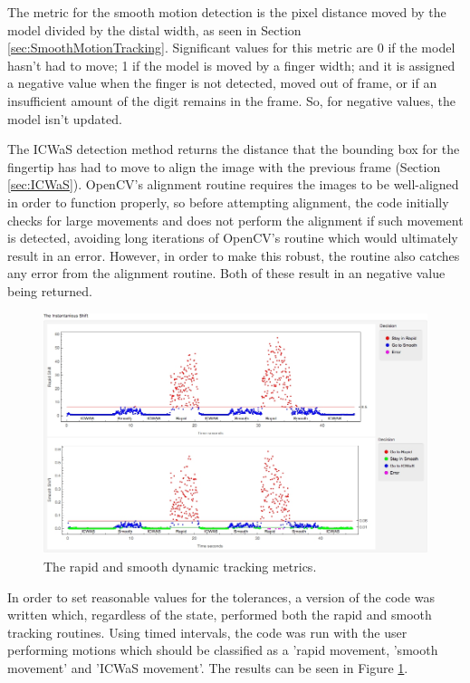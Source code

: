 The metric for the smooth motion detection is the pixel distance moved by the model divided by the distal width, as seen in Section \ref{sec:SmoothMotionTracking}. Significant values for this metric are 0 if the model hasn't had to move; 1 if the model is moved by a finger width; and it is assigned a negative value when the finger is not detected, moved out of frame, or if an insufficient amount of the digit remains in the frame. So, for negative values, the model isn't updated.

The ICWaS detection method returns the distance that the bounding box for the fingertip has had to move to align the image with the previous frame (Section \ref{sec:ICWaS}). OpenCV's alignment routine requires the images to be well-aligned in order to function properly, so before attempting alignment, the code initially checks for large movements and does not perform the alignment if such movement is detected, avoiding long iterations of OpenCV's routine which would ultimately result in an error. However, in order to make this robust, the routine also catches any error from the alignment routine. Both of these result in an negative value being returned.

\begin{figure}[tbph]
\centering
\includegraphics[width=0.95\linewidth]{Chapter4/Figs/instantaniousShiftGrfx}
\caption{The rapid and smooth dynamic tracking metrics.}
\label{fig:instantaniousshiftgrfx}
\end{figure}

In order to set reasonable values for the tolerances, a version of the code was written which, regardless of the state, performed both the rapid and smooth tracking routines. Using timed intervals, the code was run with the user performing motions which should be classified as a 'rapid movement, 'smooth movement' and 'ICWaS movement'. The results can be seen in Figure \ref{fig:instantaniousshiftgrfx}.

